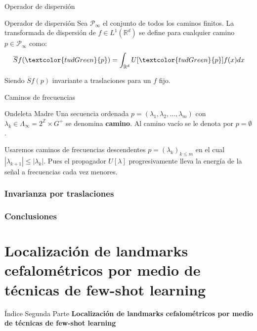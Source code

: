 \documentclass[aspectratio=43]{beamer}
\begin{document}
\begin{frame}{Operador de dispersión}
  \begin{alertblock}{Operador de dispersión}
    Sea \textcolor{tudGreen}{$\mathcal{P}_\infty$} el conjunto de todos los caminos finitos. La transformada de dispersión de $f \in L^1(\mathbb{R}^d)$ se define para cualquier camino \textcolor{tudGreen}{$p \in \mathcal{P}_\infty$} como:
    \begin{equation}
      \overline{S}f(\textcolor{tudGreen}{p})=\int_{\mathbb{R}^d}U[\textcolor{tudGreen}{p}]f(x)dx 
    \end{equation}
  \end{alertblock}
  
  Siendo $\overline{S}f(p)$ invariante a traslaciones para un $f$ fijo.
\end{frame}

\begin{frame}{Caminos de frecuencias}
  \begin{block}{Ondeleta Madre}
    Una secuencia ordenada $p=(\lambda_1,\lambda_2, \ldots , \lambda_m)$ con $\lambda_k \in \Lambda_\infty=2^{\mathbb{Z}} \times G^{+} $ se denomina \textbf{camino}. Al camino vacío se le denota por $p=\emptyset$. 
  \end{block}
  
  Usaremos caminos de frecuencias descendentes $p=(\lambda_k)_{k\leq m}$ en el cual $|\lambda_{k+1}| \leq |\lambda_k|$. Pues el propagador $U[\lambda]$ progresivamente lleva la energía de la señal a frecuencias cada vez menores.
\end{frame}

\section{Invarianza por traslaciones}

\section{Conclusiones}

\part{Localización de landmarks cefalométricos por medio de técnicas de few-shot learning}

\begin{frame}{Índice Segunda Parte}
  \textcolor{tudCyan}{\textbf{Localización de landmarks cefalométricos por medio de técnicas de few-shot learning}}
  \medskip
  \tableofcontents[part=2]
\end{frame}
\end{document}
